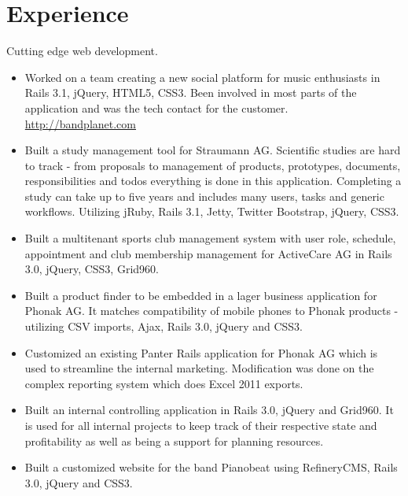 \documentclass[10pt,a4paper]{moderncv}
\begin{document}
\maketitle

\section{Experience}
{Cutting edge web development.\newline{}%
\begin{itemize}%
  \item Worked on a team creating a new social platform for music enthusiasts
    in Rails 3.1, jQuery, HTML5, CSS3. Been involved in most parts of the application
    and was the tech contact for the customer.\\
        \url{http://bandplanet.com}
  \item Built a study management tool for Straumann AG. Scientific studies are
    hard to track - from proposals to management of
    products, prototypes, documents, responsibilities and todos everything is done
    in this application. Completing a study can take up to five years and
    includes many users, tasks and generic workflows. Utilizing jRuby, Rails
    3.1, Jetty, Twitter Bootstrap, jQuery, CSS3.
  \item Built a multitenant sports club management system with user role,
    schedule, appointment and club membership management for ActiveCare AG in
    Rails 3.0, jQuery, CSS3, Grid960.
  \item Built a product finder to be embedded in a lager business application
    for Phonak AG. It matches compatibility of mobile phones to Phonak
    products - utilizing CSV imports, Ajax, Rails 3.0, jQuery and
    CSS3.
  \item Customized an existing Panter Rails application for Phonak AG which
    is used to streamline the internal marketing. Modification was done on the
    complex reporting system which does Excel 2011 exports.
  \item Built an internal controlling application in Rails 3.0, jQuery and
    Grid960. It is used for all internal projects to keep track of their
    respective state and profitability as well as being a support for planning
    resources.
  \item Built a customized website for the band Pianobeat using RefineryCMS, Rails 3.0,
    jQuery and CSS3.\\

\end{itemize}}
\end{document}
